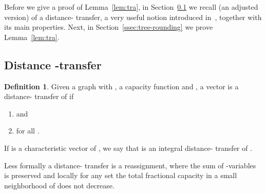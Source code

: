 \documentclass{article}
\theoremstyle{plain}
\theoremstyle{definition}
\newtheorem{definition}[theorem]{Definition}
\begin{document}
Before we give a proof of Lemma~\ref{lem:tra},
in Section~\ref{ssec:transfer} we
recall (an adjusted version) of a distance-
transfer, a very useful notion introduced in~\cite{svensson},
together with its main properties.
Next, in Section~\ref{ssec:tree-rounding} we
prove Lemma~\ref{lem:tra}.

\subsection{Distance -transfer}
\label{ssec:transfer}

 \begin{definition}\label{def:tra}
Given a graph  with , a capacity function 
and , a vector  is a distance- transfer of
 if
\begin{enumerate}
  \item  and
  \item\label{it:nei}  for all .
\end{enumerate}
If  is a characteristic vector of , we say that  is an
integral distance- transfer of .
\end{definition}

Less formally a distance- transfer is a reassignment,
where the sum of -variables is preserved and 
locally for any set  the total fractional capacity
in a small neighborhood of  does not decrease.
\end{document}
